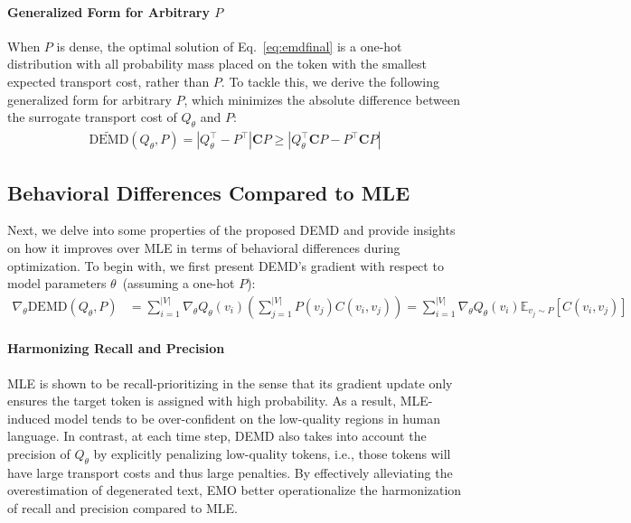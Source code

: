 \paragraph{Generalized Form for Arbitrary $P$} When $P$ is dense, the optimal solution of Eq.~\ref{eq:emdfinal} is a one-hot distribution with all probability mass placed on the token with the smallest expected transport cost, rather than $P$. To tackle this, we derive the following generalized form for arbitrary $P$, which minimizes the absolute difference between the surrogate transport cost of $Q_{\theta}$ and $P$:
\begin{align}
    \widetilde{\text{DEMD}}(Q_{\theta},P)=|Q_{\theta}^{\top}-P^{\top}|\bm{C}P\geq|Q_{\theta}^{\top}\bm{C}P-P^{\top}\bm{C}P|
\end{align}

\subsection{Behavioral Differences Compared to MLE}
Next, we delve into some properties of the proposed DEMD and provide insights on how it improves over MLE in terms of behavioral differences during optimization.
To begin with, we first present DEMD's gradient with respect to model parameters $\theta$~(assuming a one-hot $P$):
\begin{align}
    \nabla_{\theta}\text{DEMD}(Q_{\theta}, P)&=\sum_{i=1}^{|V|}\nabla_{\theta}Q_{\theta}(v_i)(\sum_{j=1}^{|V|}P(v_j)C(v_i,v_j))=\sum_{i=1}^{|V|}\nabla_{\theta}Q_{\theta}(v_i)\mathbb{E}_{v_j\sim P}[C(v_i,v_j)]
    \label{eq:demd_grad}
\end{align}
\paragraph{Harmonizing Recall and Precision}
MLE is shown to be recall-prioritizing in the sense that its gradient update only ensures the target token is assigned with high probability. As a result, MLE-induced model tends to be over-confident on the low-quality regions in human language. In contrast, at each time step, DEMD also takes into account the precision of $Q_{\theta}$ by explicitly penalizing low-quality tokens, i.e., those tokens will have large transport costs and thus large penalties. By effectively alleviating the overestimation of degenerated text, EMO better operationalize the harmonization of recall and precision compared to MLE.
